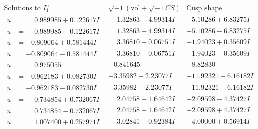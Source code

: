 \documentclass[1p]{elsarticle_modified}
\theoremstyle{definition}
\newcommand{\I}{\sqrt{-1}}
\begin{document}
$$\begin{array}{c|c|c}  
\text{Solutions to }I^u_{1}& \I (\text{vol} + \sqrt{-1}CS) & \text{Cusp shape}\\
 \hline 
\begin{aligned}
u &= \phantom{-}0.989985 + 0.122617 I\end{aligned}
 & \phantom{-}1.32863 - 4.99314 I & -5.10286 + 6.83275 I \\ \hline\begin{aligned}
u &= \phantom{-}0.989985 - 0.122617 I\end{aligned}
 & \phantom{-}1.32863 + 4.99314 I & -5.10286 - 6.83275 I \\ \hline\begin{aligned}
u &= -0.809064 + 0.581444 I\end{aligned}
 & \phantom{-}3.36810 - 0.06751 I & -1.94023 + 0.35609 I \\ \hline\begin{aligned}
u &= -0.809064 - 0.581444 I\end{aligned}
 & \phantom{-}3.36810 + 0.06751 I & -1.94023 - 0.35609 I \\ \hline\begin{aligned}
u &= \phantom{-}0.975055\phantom{ +0.000000I}\end{aligned}
 & -0.841645\phantom{ +0.000000I} & -8.82830\phantom{ +0.000000I} \\ \hline\begin{aligned}
u &= -0.962183 + 0.082730 I\end{aligned}
 & -3.35982 + 2.23077 I & -11.92321 - 6.16182 I \\ \hline\begin{aligned}
u &= -0.962183 - 0.082730 I\end{aligned}
 & -3.35982 - 2.23077 I & -11.92321 + 6.16182 I \\ \hline\begin{aligned}
u &= \phantom{-}0.734854 + 0.732067 I\end{aligned}
 & \phantom{-}2.04758 + 1.64642 I & -2.09598 - 4.37427 I \\ \hline\begin{aligned}
u &= \phantom{-}0.734854 - 0.732067 I\end{aligned}
 & \phantom{-}2.04758 - 1.64642 I & -2.09598 + 4.37427 I \\ \hline\begin{aligned}
u &= \phantom{-}1.007400 + 0.257971 I\end{aligned}
 & \phantom{-}3.02841 - 0.92384 I & -4.00000 + 0.56914 I \\ \hline\begin{aligned}

\end{aligned}
\end{array}$$
\end{document}
